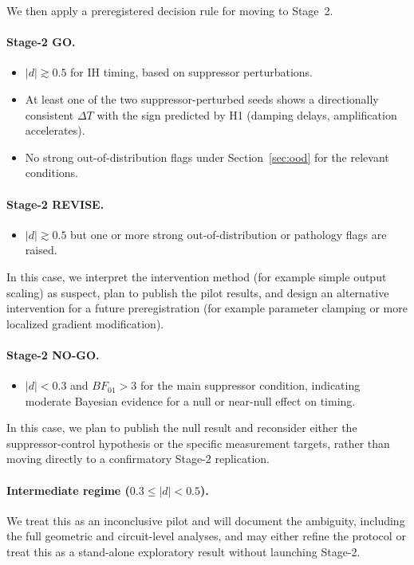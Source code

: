 \documentclass[11pt]{article}
\begin{document}
We then apply a preregistered decision rule for moving to Stage~2.

\paragraph{Stage-2 GO.}
\begin{itemize}
  \item $|d| \gtrsim 0.5$ for IH timing, based on suppressor perturbations.
  \item At least one of the two suppressor-perturbed seeds shows a directionally consistent $\Delta T$ with the sign predicted by H1 (damping delays, amplification accelerates).
  \item No strong out-of-distribution flags under Section~\ref{sec:ood} for the relevant conditions.
\end{itemize}

\paragraph{Stage-2 REVISE.}
\begin{itemize}
  \item $|d| \gtrsim 0.5$ but one or more strong out-of-distribution or pathology flags are raised.
\end{itemize}

In this case, we interpret the intervention method (for example simple output scaling) as suspect, plan to publish the pilot results, and design an alternative intervention for a future preregistration (for example parameter clamping or more localized gradient modification).

\paragraph{Stage-2 NO-GO.}
\begin{itemize}
  \item $|d| < 0.3$ and $BF_{01} > 3$ for the main suppressor condition, indicating moderate Bayesian evidence for a null or near-null effect on timing.
\end{itemize}

In this case, we plan to publish the null result and reconsider either the suppressor-control hypothesis or the specific measurement targets, rather than moving directly to a confirmatory Stage-2 replication.

\paragraph{Intermediate regime ($0.3 \le |d| < 0.5$).}
We treat this as an inconclusive pilot and will document the ambiguity, including the full geometric and circuit-level analyses, and may either refine the protocol or treat this as a stand-alone exploratory result without launching Stage-2.
\end{document}
